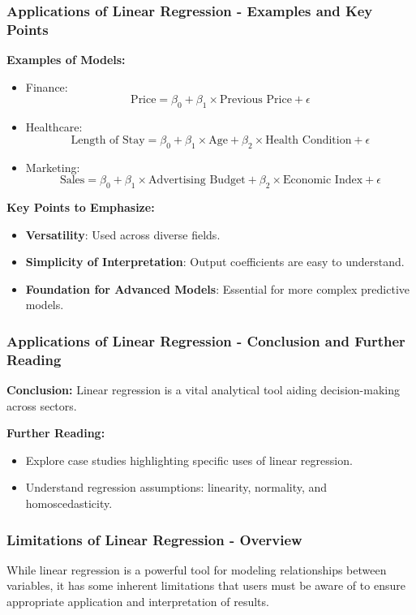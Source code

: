 \documentclass{beamer}
\begin{document}
\begin{frame}[fragile]
    \frametitle{Applications of Linear Regression - Examples and Key Points}
    
    \textbf{Examples of Models:}
    \begin{itemize}
        \item Finance: 
            \[
            \text{Price} = \beta_0 + \beta_1 \times \text{Previous Price} + \epsilon
            \]
        \item Healthcare:
            \[
            \text{Length of Stay} = \beta_0 + \beta_1 \times \text{Age} + \beta_2 \times \text{Health Condition} + \epsilon
            \]
        \item Marketing:
            \[
            \text{Sales} = \beta_0 + \beta_1 \times \text{Advertising Budget} + \beta_2 \times \text{Economic Index} + \epsilon
            \]
    \end{itemize}

    \textbf{Key Points to Emphasize:}
    \begin{itemize}
        \item \textbf{Versatility}: Used across diverse fields.
        \item \textbf{Simplicity of Interpretation}: Output coefficients are easy to understand.
        \item \textbf{Foundation for Advanced Models}: Essential for more complex predictive models.
    \end{itemize}
\end{frame}

\begin{frame}[fragile]
    \frametitle{Applications of Linear Regression - Conclusion and Further Reading}
    \textbf{Conclusion:} Linear regression is a vital analytical tool aiding decision-making across sectors. 

    \textbf{Further Reading:}
    \begin{itemize}
        \item Explore case studies highlighting specific uses of linear regression.
        \item Understand regression assumptions: linearity, normality, and homoscedasticity.
    \end{itemize}
\end{frame}

\begin{frame}[fragile]
    \frametitle{Limitations of Linear Regression - Overview}
    While linear regression is a powerful tool for modeling relationships between variables, it has some inherent limitations that users must be aware of to ensure appropriate application and interpretation of results.
\end{frame}
\end{document}
